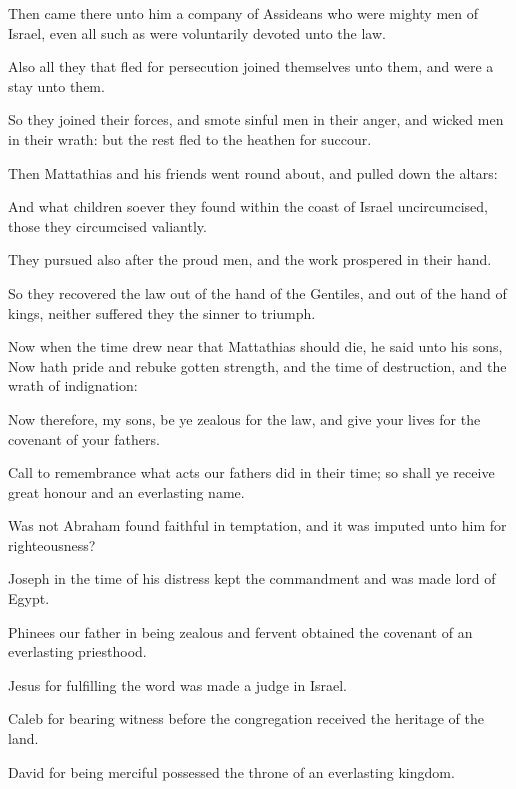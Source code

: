 {\par }{\PP {}Then came there unto him a company of Assideans who were mighty men of Israel, even all such as were voluntarily devoted unto the law.
\par }{\PP {}Also all they that fled for persecution joined themselves unto them, and were a stay unto them.
\par }{\PP {}So they joined their forces, and smote sinful men in their anger, and wicked men in their wrath: but the rest fled to the heathen for succour.
\par }{\PP {}Then Mattathias and his friends went round about, and pulled down the altars:
\par }{\PP {}And what children soever they found within the coast of Israel uncircumcised, those they circumcised valiantly.
\par }{\PP {}They pursued also after the proud men, and the work prospered in their hand.
\par }{\PP {}So they recovered the law out of the hand of the Gentiles, and out of the hand of kings, neither suffered they the sinner to triumph.
\par }{\PP {}Now when the time drew near that Mattathias should die, he said unto his sons, Now hath pride and rebuke gotten strength, and the time of destruction, and the wrath of indignation:
\par }{\PP {}Now therefore, my sons, be ye zealous for the law, and give your lives for the covenant of your fathers.
\par }{\PP {}Call to remembrance what acts our fathers did in their time; so shall ye receive great honour and an everlasting name.
\par }{\PP {}Was not Abraham found faithful in temptation, and it was imputed unto him for righteousness?
\par }{\PP {}Joseph in the time of his distress kept the commandment and was made lord of Egypt.
\par }{\PP {}Phinees our father in being zealous and fervent obtained the covenant of an everlasting priesthood.
\par }{\PP {}Jesus for fulfilling the word was made a judge in Israel.
\par }{\PP {}Caleb for bearing witness before the congregation received the heritage of the land.
\par }{\PP {}David for being merciful possessed the throne of an everlasting kingdom.
}
